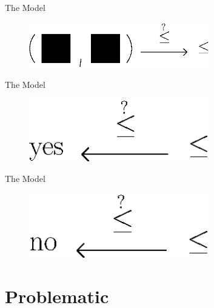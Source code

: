 \documentclass{beamer}
\begin{document}
\begin{frame}[c]{The Model}
\begin{figure}[hbtp]
\centering
\includegraphics[width=0.7\textwidth]{fig/box/ask}
\end{figure}
\end{frame}

\begin{frame}[c]{The Model}
\begin{figure}[hbtp]
\centering
\includegraphics[width=0.7\textwidth]{fig/box/yes}
\end{figure}
\end{frame}

\begin{frame}[c]{The Model}
\begin{figure}[hbtp]
\centering
\includegraphics[width=0.7\textwidth]{fig/box/no}
\end{figure}
\end{frame}

\section{Problematic}
\end{document}
